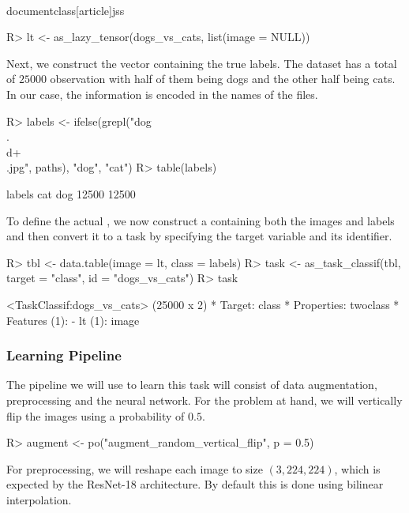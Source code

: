\\documentclass[article]{jss}
\theoremstyle{definition}
\begin{document}
\begin{CodeInput}
R> lt <- as_lazy_tensor(dogs_vs_cats, list(image = NULL))
\end{CodeInput}

Next, we construct the vector containing the true labels.
The dataset has a total of $25000$ observation with half of them being dogs and the other half being cats.
In our case, the information is encoded in the names of the files.

\begin{CodeInput}
R> labels <- ifelse(grepl("dog\\.\\d+\\.jpg", paths), "dog", "cat")
R> table(labels)
\end{CodeInput}
\begin{CodeOutput}
labels
  cat   dog
12500 12500
\end{CodeOutput}

To define the actual , we now construct a  \citep{ref-datatable2024} containing both the images and labels and then convert it to a task by specifying the target variable and its identifier.

\begin{CodeInput}
R> tbl <- data.table(image = lt, class = labels)
R> task <- as_task_classif(tbl, target = "class", id = "dogs_vs_cats")
R> task
\end{CodeInput}
\begin{CodeOutput}
<TaskClassif:dogs_vs_cats> (25000 x 2)
* Target: class
* Properties: twoclass
* Features (1):
  - lt (1): image
\end{CodeOutput}

\subsubsection{Learning Pipeline}

The pipeline we will use to learn this task will consist of data augmentation, preprocessing and the neural network.
For the problem at hand, we will vertically flip the images using a probability of $0.5$.

\begin{CodeInput}
R> augment <- po("augment_random_vertical_flip", p = 0.5)
\end{CodeInput}

For preprocessing, we will reshape each image to size $(3, 224, 224)$, which is expected by the ResNet-18 architecture.
By default this is done using bilinear interpolation.
\end{document}
